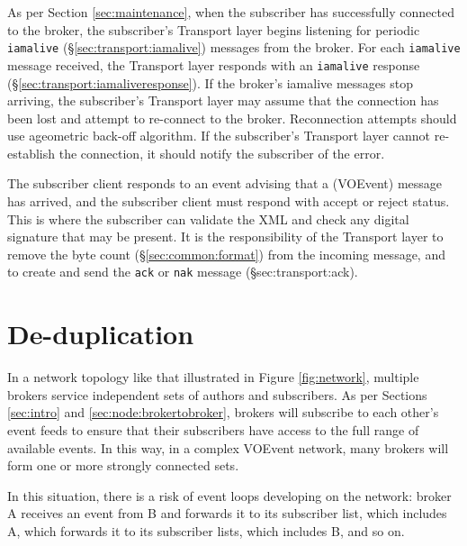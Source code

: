 \documentclass[a4paper,11pt]{ivoa}
\begin{document}
As per Section \ref{sec:maintenance}, when the subscriber has successfully connected to the
broker, the subscriber's Transport layer begins listening for periodic
\texttt{iamalive} (\S\ref{sec:transport:iamalive}) messages from the broker.
For each \texttt{iamalive} message
received, the Transport layer responds with an \texttt{iamalive} response
(\S\ref{sec:transport:iamaliveresponse}).
If the broker's iamalive messages stop arriving, the subscriber's Transport
layer may assume that the connection has been lost and attempt to re-connect
to the broker. Reconnection attempts should use ageometric back-off algorithm.
If the subscriber's Transport layer cannot re-establish the connection, it
should notify the subscriber of the error.

The subscriber client responds to an event advising that a (VOEvent) message
has arrived, and the subscriber client must respond with accept or reject
status. This is where the subscriber can validate the XML and check any
digital signature that may be present. It is the responsibility of the
Transport layer to remove the byte count (\S\ref{sec:common:format}) from the
incoming message, and to create and send the \texttt{ack} or \texttt{nak}
message (\S{sec:transport:ack}).

\section{De-duplication}
\label{sec:dedup}

In a network topology like that illustrated in Figure \ref{fig:network},
multiple brokers service independent sets of authors and subscribers. As per
Sections \ref{sec:intro} and \ref{sec:node:brokertobroker}, brokers will
subscribe to each other's event feeds to ensure that their subscribers have
access to the full range of available events. In this way, in a complex
VOEvent network, many brokers will form one or more strongly connected sets.

In this situation, there is a risk of event loops developing on the network:
broker A receives an event from B and forwards it to its subscriber list,
which includes A, which forwards it to its subscriber lists, which includes B,
and so on.
\end{document}
